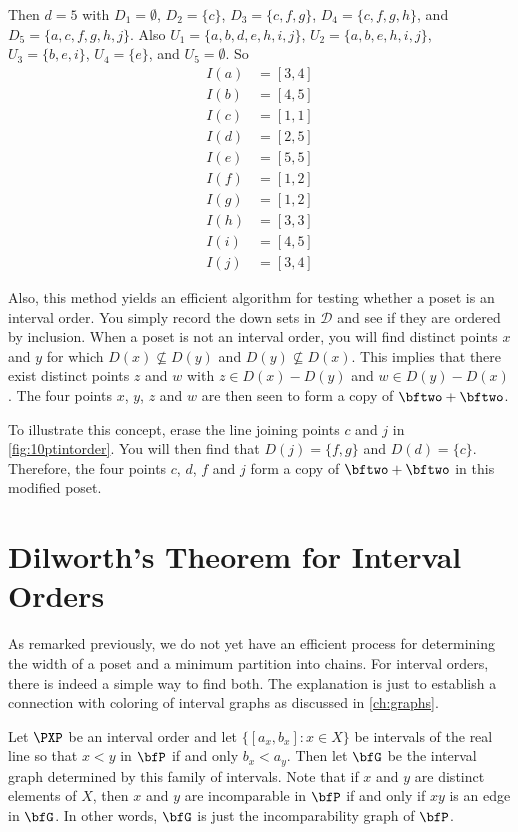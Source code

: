 Then $d= 5$ with 
$D_1=\emptyset$, $D_2=\{c\}$, $D_3=\{c,f,g\}$, $D_4=\{c,f,g,h\}$, and 
$D_5=\{a,c,f,g,h,j\}$.  Also
$U_1=\{a,b,d,e,h,i,j\}$, $U_2=\{a,b,e,h,i,j\}$,
$U_3=\{b,e,i\}$, $U_4=\{e\}$, and $U_5=\emptyset$.
So
\begin{align*}
I(a) &= [3,4]\\
I(b) &= [4,5]\\
I(c) &= [1,1]\\
I(d) &= [2,5]\\
I(e) &= [5,5]\\
I(f) &= [1,2]\\
I(g) &= [1,2]\\
I(h) &= [3,3]\\
I(i) &= [4,5]\\
I(j) &= [3,4]
\end{align*}

Also, this method yields an efficient algorithm for testing
whether a poset is an interval order.  You simply record the
down sets in $\mathcal{D}$ and see if they are ordered by
inclusion.  When a poset is not an interval order, you will
find distinct points $x$ and $y$ for which $D(x)\nsubseteq D(y)$
and $D(y)\nsubseteq D(x)$.  This implies that there exist
distinct points $z$ and $w$ with
$z\in D(x)-D(y)$ and $w\in D(y)-D(x)$.  The four points $x$, $y$,
$z$ and $w$ are then seen to form a copy of $\bftwo+\bftwo$. 

To illustrate this concept, erase the line joining points $c$ and $j$
in \autoref{fig:10ptintorder}.  You will then find that $D(j)=\{f,g\}$
and $D(d)=\{c\}$.  Therefore, the four points $c$, $d$, $f$ and $j$
form a copy of $\bftwo+\bftwo$ in this modified poset.

\section{Dilworth's Theorem for Interval Orders}\label{s:posets:dilworth-intord}

As remarked previously, we do not yet have an efficient
process for determining the width of a poset and a minimum
partition into chains.  For interval orders, there is indeed
a simple way to find both. The explanation is just to establish
a connection with coloring of interval graphs as discussed in
\autoref{ch:graphs}.

Let $\PXP$ be an interval order and let 
$\{[a_x,b_x]:x\in X\}$ be intervals of the real line
so that $x<y$ in $\bfP$ if and only $b_x<a_y$.
Then let $\bfG$ be the interval graph determined by this
family of intervals.  Note that if $x$ and $y$ are distinct
elements of $X$, then $x$ and $y$ are incomparable in $\bfP$ if and
only if $xy$ is an edge in $\bfG$.  In other words, $\bfG$ is
just the incomparability graph of $\bfP$.

